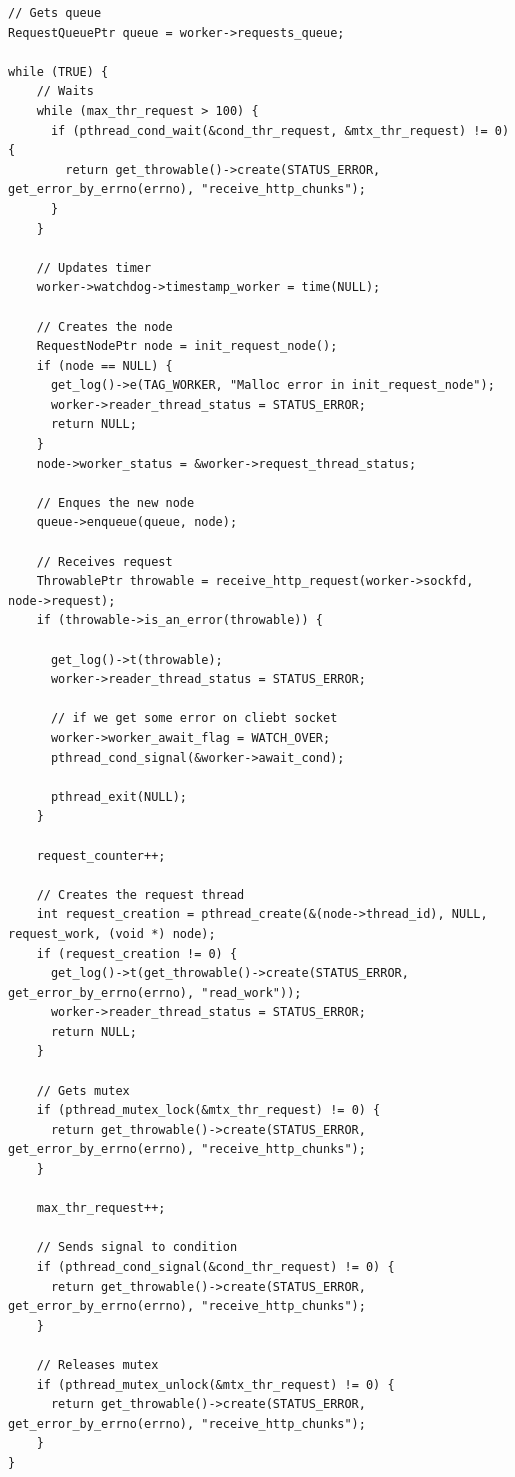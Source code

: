 \documentclass[italian]{tktltiki2}
\begin{document}
\begin{lstlisting}
// Gets queue
RequestQueuePtr queue = worker->requests_queue;

while (TRUE) {
    // Waits
    while (max_thr_request > 100) {
      if (pthread_cond_wait(&cond_thr_request, &mtx_thr_request) != 0) {
        return get_throwable()->create(STATUS_ERROR, get_error_by_errno(errno), "receive_http_chunks");
      }
    }

    // Updates timer
    worker->watchdog->timestamp_worker = time(NULL);

    // Creates the node
    RequestNodePtr node = init_request_node();
    if (node == NULL) {
      get_log()->e(TAG_WORKER, "Malloc error in init_request_node");
      worker->reader_thread_status = STATUS_ERROR;
      return NULL;
    }
    node->worker_status = &worker->request_thread_status;

    // Enques the new node
    queue->enqueue(queue, node);
    
    // Receives request
    ThrowablePtr throwable = receive_http_request(worker->sockfd, node->request);
    if (throwable->is_an_error(throwable)) {
        
      get_log()->t(throwable);
      worker->reader_thread_status = STATUS_ERROR;
        
      // if we get some error on cliebt socket 
      worker->worker_await_flag = WATCH_OVER;
      pthread_cond_signal(&worker->await_cond);
        
      pthread_exit(NULL);
    }

    request_counter++;

    // Creates the request thread
    int request_creation = pthread_create(&(node->thread_id), NULL, request_work, (void *) node);
    if (request_creation != 0) {
      get_log()->t(get_throwable()->create(STATUS_ERROR, get_error_by_errno(errno), "read_work"));
      worker->reader_thread_status = STATUS_ERROR;
      return NULL;
    }

    // Gets mutex
    if (pthread_mutex_lock(&mtx_thr_request) != 0) {
      return get_throwable()->create(STATUS_ERROR, get_error_by_errno(errno), "receive_http_chunks");
    }

    max_thr_request++;

    // Sends signal to condition
    if (pthread_cond_signal(&cond_thr_request) != 0) {
      return get_throwable()->create(STATUS_ERROR, get_error_by_errno(errno), "receive_http_chunks");
    }

    // Releases mutex
    if (pthread_mutex_unlock(&mtx_thr_request) != 0) {
      return get_throwable()->create(STATUS_ERROR, get_error_by_errno(errno), "receive_http_chunks");
    }
}
\end{lstlisting}
\end{document}
